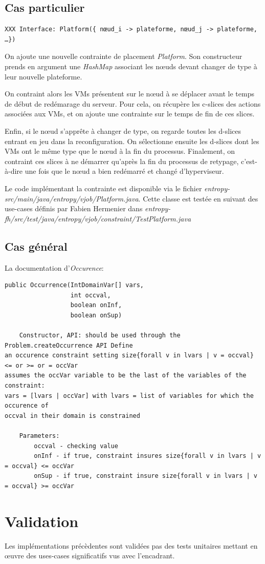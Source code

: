 \documentclass[a4paper]{article}
\begin{document}
\subsection{Cas particulier}
\begin{verbatim}
XXX Interface: Platform({ nœud_i -> plateforme, nœud_j -> plateforme, …})
\end{verbatim}

On ajoute une nouvelle contrainte de placement \textit{Platform}. Son
constructeur prends en argument une \textit{HashMap} associant les
nœuds devant changer de type à leur nouvelle plateforme.

On contraint alors les VMs présentent sur le nœud à se déplacer
avant le temps de début de redémarage du serveur. Pour cela, on
récupère les c-slices des actions associées aux VMs, et on ajoute
une contrainte sur le temps de fin de ces slices.

Enfin, si le nœud s'apprête à changer de type, on regarde toutes
les d-slices entrant en jeu dans la reconfiguration. On sélectionne
ensuite les d-slices dont les VMs ont le même type que le nœud à la fin
du processus. Finalement, on contraint ces slices à ne démarrer
qu'après la fin du processus de retypage, c'est-à-dire une fois que
le nœud a bien redémarré et changé d'hyperviseur.

Le code implémentant la contrainte est disponible via le fichier
\textit{entropy-src/main/java/entropy/vjob/Platform.java}. Cette
classe est testée en suivant des use-cases définis par Fabien Hermenier dans
\textit{entropy-fh/src/test/java/entropy/vjob/constraint/TestPlatform.java}

\subsection{Cas général}
La documentation d'\textit{Occurence}:
\begin{verbatim}
public Occurrence(IntDomainVar[] vars,
                  int occval,
                  boolean onInf,
                  boolean onSup)

    Constructor, API: should be used through the Problem.createOccurrence API Define
an occurence constraint setting size{forall v in lvars | v = occval} <= or >= or = occVar
assumes the occVar variable to be the last of the variables of the constraint:
vars = [lvars | occVar] with lvars = list of variables for which the occurence of
occval in their domain is constrained

    Parameters:
        occval - checking value
        onInf - if true, constraint insures size{forall v in lvars | v = occval} <= occVar
        onSup - if true, constraint insure size{forall v in lvars | v = occval} >= occVar

\end{verbatim}

\section{Validation}
Les implémentations précèdentes sont validées pas des tests unitaires mettant
en œuvre des uses-cases significatifs vus avec l'encadrant.

\newpage
{}


\end{document}
